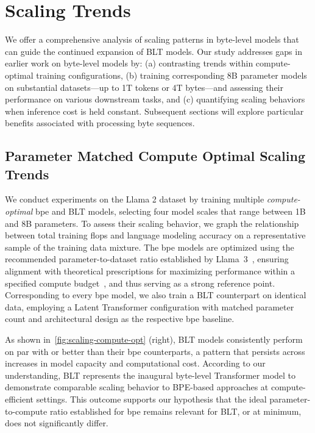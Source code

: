 \section{Scaling Trends}
\label{section:scaling}

We offer a comprehensive analysis of scaling patterns in byte-level models that can guide the continued expansion of {\textsc BLT} models. Our study addresses gaps in earlier work on byte-level models by: (a) contrasting trends within compute-optimal training configurations, (b) training corresponding 8B parameter models on substantial datasets—up to 1T tokens or 4T bytes—and assessing their performance on various downstream tasks, and (c) quantifying scaling behaviors when inference cost is held constant. Subsequent sections will explore particular benefits associated with processing byte sequences.

\subsection{Parameter Matched Compute Optimal Scaling Trends}
\label{section:parameter-matched-scaling}
We conduct experiments on the Llama 2 dataset by training multiple \textit{compute-optimal} bpe and {\textsc BLT} models, selecting four model scales that range between 1B and 8B parameters. To assess their scaling behavior, we graph the relationship between total training flops and language modeling accuracy on a representative sample of the training data mixture. The bpe models are optimized using the recommended parameter-to-dataset ratio established by Llama~3~\citep{dubey2024llama}, ensuring alignment with theoretical prescriptions for maximizing performance within a specified compute budget~\citep{hoffmann2022training}, and thus serving as a strong reference point. Corresponding to every bpe model, we also train a {\textsc BLT} counterpart on identical data, employing a Latent Transformer configuration with matched parameter count and architectural design as the respective bpe baseline.

As shown in~\autoref{fig:scaling-compute-opt} (right), {\textsc BLT} models consistently perform on par with or better than their bpe counterparts, a pattern that persists across increases in model capacity and computational cost. According to our understanding, {\textsc BLT} represents the inaugural byte-level Transformer model to demonstrate comparable scaling behavior to BPE-based approaches at compute-efficient settings. This outcome supports our hypothesis that the ideal parameter-to-compute ratio established for bpe remains relevant for {\textsc BLT}, or at minimum, does not significantly differ.

